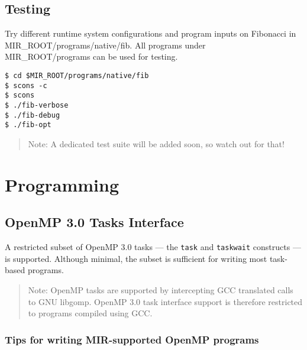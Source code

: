 \documentclass[11pt,a4paper]{article}
\begin{document}
\subsection{Testing}\label{testing}

Try different runtime system configurations and program inputs on Fibonacci in MIR\_ROOT/programs/native/fib. All programs under \\ MIR\_ROOT/programs can be used for testing.

\begin{lstlisting}[style=MyInputStyle]
$ cd $MIR_ROOT/programs/native/fib
$ scons -c
$ scons
$ ./fib-verbose
$ ./fib-debug
$ ./fib-opt
\end{lstlisting}

\begin{framed}
\begin{quote}
Note: A dedicated test suite will be added soon, so watch out for that!
\end{quote}
\end{framed}

\section{Programming}\label{programming}

\subsection{OpenMP 3.0 Tasks Interface}\label{openmp-3.0-tasks-interface}

A restricted subset of OpenMP 3.0 tasks --- the \texttt{task} and \texttt{taskwait} constructs --- is supported. Although minimal, the subset is sufficient for writing most task-based programs.  

\begin{framed}
\begin{quote}
Note: OpenMP tasks are supported by intercepting GCC translated calls to GNU libgomp. OpenMP 3.0 task interface support is therefore restricted to programs compiled using GCC.
\end{quote}
\end{framed}

\subsubsection{Tips for writing MIR-supported OpenMP programs}\label{tips-for-writing-mir-supported-openmp-programs}
\end{document}
